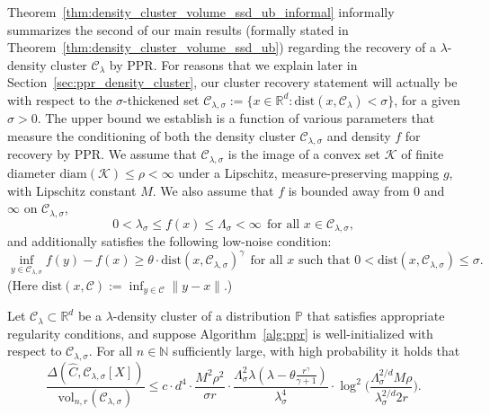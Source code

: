\documentclass[11pt,twoside]{article}
\newcommand{\Reals}{\mathbb{R}}
\newcommand{\1}{\mathbf{1}}
\newcommand{\Rd}{\Reals^d}
\newcommand{\mc}[1]{\mathcal{#1}}
\newcommand{\Pbb}{\mathbb{P}}
\newcommand{\wh}[1]{\widehat{#1}}
\newcommand{\dist}{\mathrm{dist}}
\newcommand{\vol}{\mathrm{vol}}
\begin{document}
Theorem~\ref{thm:density_cluster_volume_ssd_ub_informal} informally summarizes the second of our main results (formally stated in Theorem~\ref{thm:density_cluster_volume_ssd_ub}) regarding the recovery of a $\lambda$-density cluster $\mc{C}_{\lambda}$ by PPR. For reasons that we explain later in Section~\ref{sec:ppr_density_cluster}, our cluster recovery statement will actually be with respect to the $\sigma$-thickened set $\mc{C}_{\lambda,\sigma} := \{x \in \Rd: \mathrm{dist}(x,\mc{C}_{\lambda}) < \sigma\}$, for a given $\sigma > 0$. The upper bound we establish is a function of various parameters that measure the conditioning of both the density cluster $\mc{C}_{\lambda,\sigma}$ and density $f$ for recovery by PPR. We assume that $\mc{C}_{\lambda,\sigma}$ is the image of a convex set $\mc{K}$ of finite diameter $\mathrm{diam}(\mc{K}) \leq \rho < \infty$ under a Lipschitz, measure-preserving mapping $g$, with Lipschitz constant $M$. We also assume that $f$ is bounded away from $0$ and $\infty$ on $\mc{C}_{\lambda,\sigma}$,
\begin{equation*}
0 < \lambda_{\sigma} \leq f(x) \leq \Lambda_{\sigma} < \infty~~\textrm{for all $x \in \mc{C}_{\lambda,\sigma}$},
\end{equation*}
and additionally satisfies the following low-noise condition:
\begin{equation*}
\inf_{y \in \mc{C}_{\lambda,\sigma}} f(y) - f(x) \geq  \theta \cdot \dist(x, \mc{C}_{\lambda,\sigma})^{\gamma}~~\textrm{for all $x$ such that $0 < \dist(x,\mc{C}_{\lambda,\sigma}) \leq \sigma$.}
\end{equation*}
(Here $\dist(x,\mc{C}) := \inf_{y \in \mc{C}} \|y - x\|$.) 
\begin{theorem}[Informal]
	\label{thm:density_cluster_volume_ssd_ub_informal}
	Let $\mc{C}_{\lambda} \subset \Rd$ be a $\lambda$-density cluster of a distribution $\Pbb$ that satisfies appropriate regularity conditions, and suppose Algorithm~\ref{alg:ppr} is well-initialized with respect to $\mc{C}_{\lambda,\sigma}$. For all $n \in \mathbb{N}$ sufficiently large, with high probability it holds that
	\begin{equation}
	\label{eqn:density_cluster_volume_ssd_ub_informal}
	\frac{\Delta(\wh{C},\mc{C}_{\lambda,\sigma}[X])}{\vol_{n,r}(\mc{C}_{\lambda,\sigma})} \leq c \cdot d^4 \cdot \frac{M^2\rho^2}{\sigma r} \cdot \frac{\Lambda_{\sigma}^2 \lambda (\lambda - \theta \frac{r^{\gamma}}{\gamma + 1})}{\lambda_{\sigma}^4} \cdot \log^2\biggl(\frac{\Lambda_{\sigma}^{2/d} M\rho}{\lambda_{\sigma}^{2/d}2r}\biggr).
	\end{equation}
\end{theorem}
\end{document}
